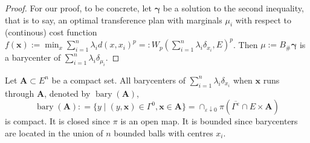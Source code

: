 \begin{proof}
	For our proof, to be concrete,
	let $\boldsymbol \gamma$ be a solution to the second inequality,
	that is to say,
	an optimal transference plan with marginals $\mu_i$ with respect to (continous) cost function
	$f(\boldsymbol{x}):=\min_{x} \sum_{i=1}^{n} \lambda_i d(x, x_i)^p = : W_p(\sum_{i=1}^n \lambda_i \delta_{x_i}, E)^p$.
	Then $\mu:= B_{\#}\boldsymbol \gamma$ is a barycenter of $\sum_{i=1}^{n}\lambda_i \delta_{\mu_i}$.
\end{proof}

\begin{rmk}
	\label{rmk:barycenter_compact}
	Let $\boldsymbol{A} \subset E^n$ be a compact set.
	All barycenters of $\sum_{i=1}^n \lambda_i \delta_{x_i}$ when $\boldsymbol{x}$ runs through $\boldsymbol{A}$,
	denoted by $\operatorname{bary}( \boldsymbol{A} )$,
	\[
		\operatorname{bary}( \boldsymbol{A} ) :
		=\{y \mid (y, \boldsymbol{x}) \in \Gamma^0, \boldsymbol{x} \in \boldsymbol{A} \}
		= \cap_{\varepsilon \downarrow 0} \pi ( \overline{ \Gamma^\varepsilon } \cap E \times \boldsymbol{A})
	\]
	is compact.
	It is closed since $\pi$ is an open map.
	It is bounded since barycenters are located in the union of $n$ bounded balls with centres $x_i$.
\end{rmk}
